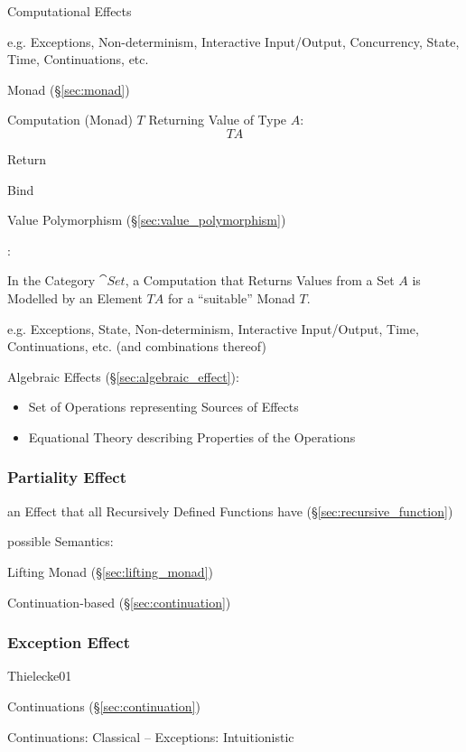 Computational Effects

e.g. Exceptions, Non-determinism, Interactive Input/Output,
Concurrency, State, Time, Continuations, etc. \cite{plotkin-pretnar09}

Monad (\S\ref{sec:monad})

Computation (Monad) $T$ Returning Value of Type $A$:
\[
  T A
\]

Return

Bind

Value Polymorphism (\S\ref{sec:value_polymorphism})

\cite{plotkin-pretnar13}:

In the Category $\cat{Set}$, a Computation that Returns Values from a
Set $A$ is Modelled by an Element $T A$ for a ``suitable'' Monad $T$.

e.g. Exceptions, State, Non-determinism, Interactive Input/Output,
Time, Continuations, etc. (and combinations thereof)

Algebraic Effects (\S\ref{sec:algebraic_effect}):
\begin{itemize}
  \item Set of Operations representing Sources of Effects
  \item Equational Theory describing Properties of the Operations
\end{itemize}



\subsubsection{Partiality Effect}\label{sec:partiality_effect}

an Effect that all Recursively Defined Functions have
(\S\ref{sec:recursive_function})

possible Semantics:

Lifting Monad (\S\ref{sec:lifting_monad})

Continuation-based (\S\ref{sec:continuation})



\subsubsection{Exception Effect}\label{sec:exception_effect}

Thielecke01

Continuations (\S\ref{sec:continuation})

Continuations: Classical -- Exceptions: Intuitionistic

